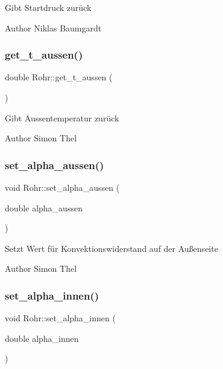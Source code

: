 Gibt Startdruck zurück \begin{DoxyAuthor}{Author}
Niklas Baumgardt 
\end{DoxyAuthor}
\mbox{\label{class_rohr_a5d7b97148ffb9e42e5dc9b5657a64cc0}} 
\subsubsection{\texorpdfstring{get\+\_\+t\+\_\+aussen()}{get\_t\_aussen()}}
{\footnotesize\ttfamily double Rohr\+::get\+\_\+t\+\_\+aussen (\begin{DoxyParamCaption}{ }\end{DoxyParamCaption})}

Gibt Aussentemperatur zurück \begin{DoxyAuthor}{Author}
Simon Thel 
\end{DoxyAuthor}
\mbox{\label{class_rohr_ae6e604082fdb43a35bcdc74478ced8a7}} 
\subsubsection{\texorpdfstring{set\+\_\+alpha\+\_\+aussen()}{set\_alpha\_aussen()}}
{\footnotesize\ttfamily void Rohr\+::set\+\_\+alpha\+\_\+aussen (\begin{DoxyParamCaption}\item[{double}]{alpha\+\_\+aussen }\end{DoxyParamCaption})}

Setzt Wert für Konvektionswiderstand auf der Außenseite \begin{DoxyAuthor}{Author}
Simon Thel 
\end{DoxyAuthor}
\mbox{\label{class_rohr_aed25a50fcf5c735e51693303d8b41663}} 
\subsubsection{\texorpdfstring{set\+\_\+alpha\+\_\+innen()}{set\_alpha\_innen()}}
{\footnotesize\ttfamily void Rohr\+::set\+\_\+alpha\+\_\+innen (\begin{DoxyParamCaption}\item[{double}]{alpha\+\_\+innen }\end{DoxyParamCaption})}

